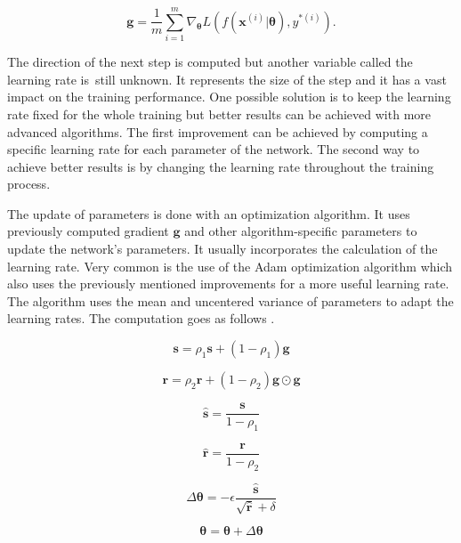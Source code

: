 \begin{equation}
    \label{eq:sgd}
    \pmb g = \frac{1}{m} \sum\limits_{i=1}^{m} \nabla_{\pmb \theta} L(f(\pmb {x}^{(i)}| \pmb \theta), {y}^{*(i)}).
\end{equation}

The direction of the next step is computed but another variable called the learning rate is~still unknown. It represents the size of the step and it has a vast impact on the training performance. One possible solution is to keep the learning rate fixed for the whole training but better results can be achieved with more advanced algorithms. The first improvement can be achieved by computing a specific learning rate for each parameter of the network. The second way to achieve better results is by changing the learning rate throughout the training process.

The update of parameters is done with an optimization algorithm. It uses previously computed gradient $\pmb g$ and other algorithm-specific parameters to update the network's parameters. It usually incorporates the calculation of the learning rate. Very common is the use of the Adam optimization algorithm which also uses the previously mentioned improvements for a more useful learning rate. The algorithm uses the mean and uncentered variance of parameters to adapt the learning rates. The computation goes as follows \cite{kingma2017adam}.

\begin{equation}
    \pmb s = \rho_1 \pmb s + (1 - \rho_1) \pmb g
\end{equation}

\begin{equation}
    \pmb r = \rho_2 \pmb r + (1 - \rho_2) \pmb g \odot \pmb g
\end{equation}

\begin{equation}
    \hat{\pmb s} = \frac{\pmb s}{1 - \rho_1}
\end{equation}

\begin{equation}
    \hat{\pmb r} = \frac{\pmb r}{1 - \rho_2}
\end{equation}

\begin{equation}
    \Delta \pmb \theta = - \epsilon \frac{\hat{\pmb s}}{\sqrt{\hat{\pmb r}} + \delta}
\end{equation}

\begin{equation}
    \pmb \theta = \pmb \theta + \Delta \pmb \theta
\end{equation}

